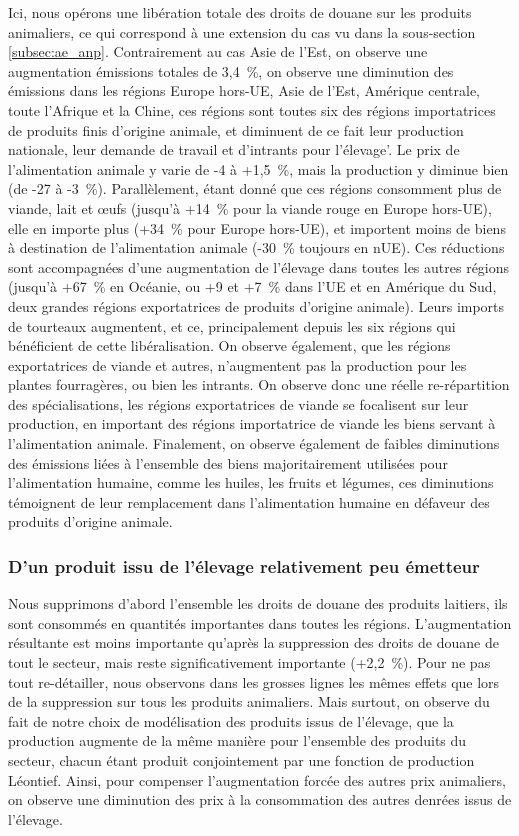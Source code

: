 Ici, nous opérons une libération totale des droits de douane sur les produits animaliers, ce qui correspond à une extension du cas vu dans la sous-section \ref{subsec:ae_anp}. Contrairement au cas Asie de l'Est, on observe une augmentation émissions totales de 3,4~\%, on observe une diminution des émissions dans les régions Europe hors-UE, Asie de l'Est, Amérique centrale, toute l'Afrique et la Chine, ces régions sont toutes six des régions importatrices de produits finis d'origine animale, et diminuent de ce fait leur production nationale, leur demande de travail et d'intrants pour l'élevage'. Le prix de l'alimentation animale y varie de -4 à +1,5~\%, mais la production y diminue bien (de -27 à -3~\%). Parallèlement, étant donné que ces régions consomment plus de viande, lait et œufs (jusqu'à +14~\% pour la viande rouge en Europe hors-UE), elle en importe plus (+34~\% pour Europe hors-UE), et importent moins de biens à destination de l'alimentation animale (-30~\% toujours en nUE). Ces réductions sont accompagnées d'une augmentation de l'élevage dans toutes les autres régions (jusqu'à +67~\% en Océanie, ou +9 et +7~\% dans l'UE et en Amérique du Sud, deux grandes régions exportatrices de produits d'origine animale). Leurs imports de tourteaux augmentent, et ce, principalement depuis les six régions qui bénéficient de cette libéralisation. On observe également, que les régions exportatrices de viande et autres, n'augmentent pas la production pour les plantes fourragères, ou bien les intrants. On observe donc une réelle re-répartition des spécialisations, les régions exportatrices de viande se focalisent sur leur production, en important des régions importatrice de viande les biens servant à l'alimentation animale. Finalement, on observe également de faibles diminutions des émissions liées à l'ensemble des biens majoritairement utilisées pour l'alimentation humaine, comme les huiles, les fruits et légumes, ces diminutions témoignent de leur remplacement dans l'alimentation humaine en défaveur des produits d'origine animale.

\subsubsection{D'un produit issu de l'élevage relativement peu émetteur}

Nous supprimons d'abord l'ensemble les droits de douane des produits laitiers, ils sont consommés en quantités importantes dans toutes les régions. L'augmentation résultante est moins importante qu'après la suppression des droits de douane de tout le secteur, mais reste significativement importante (+2,2~\%). Pour ne pas tout re-détailler, nous observons dans les grosses lignes les mêmes effets que lors de la suppression sur tous les produits animaliers. Mais surtout, on observe du fait de notre choix de modélisation des produits issus de l'élevage, que la production augmente de la même manière pour l'ensemble des produits du secteur, chacun étant produit conjointement par une fonction de production Léontief. Ainsi, pour compenser l'augmentation forcée des autres prix animaliers, on observe une diminution des prix à la consommation des autres denrées issus de l'élevage.

